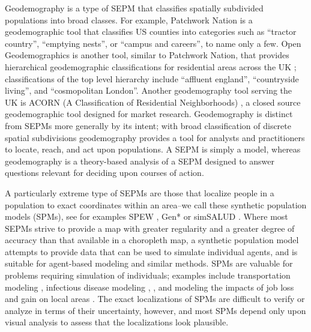 \documentclass[draft]{article}
\begin{document}
Geodemography is a type of SEPM that classifies spatially subdivided populations into broad classes.  For example, Patchwork Nation \cite{pwnation} is a geodemographic tool that classifies US counties into categories such as ``tractor country'', ``emptying nests'', or ``campus and careers'', to name only a few.  Open Geodemographics is another tool, similar to Patchwork Nation, that provides hierarchical geodemographic classifications for residential areas across the UK \cite{oacug}; classifications of the top level hierarchy include ``affluent england'', ``countryside living'', and ``cosmopolitan London''.  Another geodemography tool serving the UK is ACORN (A Classification of Residential Neighborhoods) \cite{acorn}, a closed source geodemographic tool designed for market research.  Geodemography is distinct from SEPMs more generally by its intent; with broad classification of discrete spatial subdivisions geodemography provides a tool for analysts and practitioners to locate, reach, and act upon populations.  A SEPM is simply a model, whereas geodemography is a theory-based analysis of a SEPM designed to answer questions relevant for deciding upon courses of action.  %

A particularly extreme type of SEPMs are those that localize people in a population to exact coordinates within an area--we call these synthetic population models (SPMs), see for examples SPEW \cite{gallagher18}, Gen* \cite{chapuis18} or simSALUD \cite{tomintz13}.  Where most SEPMs strive to provide a map with greater regularity and a greater degree of accuracy than that available in a choropleth map, a synthetic population model attempts to provide data that can be used to simulate individual agents, and is suitable for agent-based modeling and similar methods.  SPMs are valuable for problems requiring simulation of individuals; examples include transportation modeling \cite{barthelemy13}, infectious disease modeling \cite{xu17}, \cite{gallagher18}, and modeling the impacts of job loss and gain on local areas \cite{ballas01, ballas06}.  The exact localizations of SPMs are difficult to verify or analyze in terms of their uncertainty, however, and most SPMs depend only upon visual analysis to assess that the localizations look plausible.  %
\end{document}

